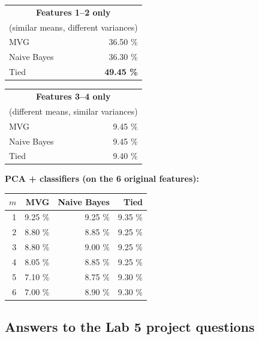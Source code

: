 \documentclass[11pt,a4paper]{article}
\begin{document}
\begin{table}[H]
\centering
\begin{tabular}{lr}
\toprule
\multicolumn{2}{c}{\textbf{Features 1--2 only}} \\
\multicolumn{2}{c}{(similar means, different variances)} \\
\midrule
MVG          & 36.50 \% \\
Naive Bayes  & 36.30 \% \\
Tied         & \textbf{49.45 \%} \\
\bottomrule
\end{tabular}
\hspace{1em}
\begin{tabular}{lr}
\toprule
\multicolumn{2}{c}{\textbf{Features 3--4 only}} \\
\multicolumn{2}{c}{(different means, similar variances)} \\
\midrule
MVG          & 9.45 \% \\
Naive Bayes  & 9.45 \% \\
Tied         & 9.40 \% \\
\bottomrule
\end{tabular}
\end{table}

\textbf{PCA + classifiers (on the 6 original features):}

\begin{table}[H]
\centering
\begin{tabular}{rrrr}
\toprule
$m$ & MVG    & Naive Bayes & Tied    \\
\midrule
1   & 9.25 \% & 9.25 \% & 9.35 \% \\
2   & 8.80 \% & 8.85 \% & 9.25 \% \\
3   & 8.80 \% & 9.00 \% & 9.25 \% \\
4   & 8.05 \% & 8.85 \% & 9.25 \% \\
5   & 7.10 \% & 8.75 \% & 9.30 \% \\
6   & 7.00 \% & 8.90 \% & 9.30 \% \\
\bottomrule
\end{tabular}
\end{table}

\subsection{Answers to the Lab 5 project questions}
\end{document}
